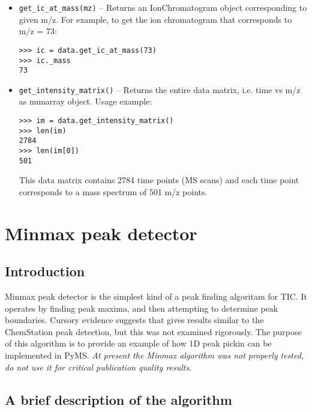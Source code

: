 \begin{itemize}
\item {\tt get\_ic\_at\_mass(mz)} -- Returns an IonChromatogram
object corresponding to given m/z. For example, to get the ion
chromatogram that corresponds to m/z = 73:

\begin{verbatim}
>>> ic = data.get_ic_at_mass(73)
>>> ic._mass
73
\end{verbatim}

\item {\tt get\_intensity\_matrix()} -- Returns the entire data
matrix, i.e. time vs m/z as numarray object. Usage example:

\begin{verbatim}
>>> im = data.get_intensity_matrix()
>>> len(im)
2784
>>> len(im[0])
501
\end{verbatim}

This data matrix contains 2784 time points (MS scans) and each time
point corresponds to a mass spectrum of 501 m/z points.

\end{itemize}


\section{Minmax peak detector}

\subsection{Introduction}

Minmax peak detector is the simplest kind of a peak finding algoritam for
TIC. It operates by finding peak maxima, and then attempting to determine
peak boundaries. Cursory evidence suggests that gives results similar to
the ChemStation peak detection, but this was not examined rigorously.
The purpose of this algorithm is to provide an example of how 1D peak
pickin can be implemented in PyMS. {\em At present the Minmax algorithm
was not properly tested, do not use it for critical publication quality
results}.

\subsection{A brief description of the algorithm}

